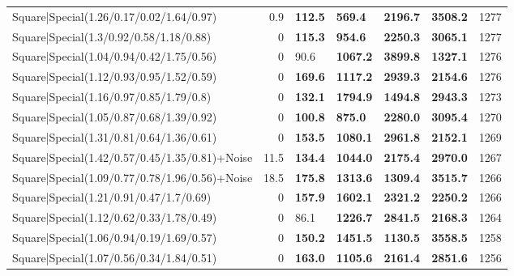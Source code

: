 \begin{tabular}{lrllllr}
 Square|Special(1.26/0.17/0.02/1.64/0.97)                      &             0.9 & \textbf{112.5} & \textbf{569.4}  & \textbf{2196.7} & \textbf{3508.2} &         1277 \\
 Square|Special(1.3/0.92/0.58/1.18/0.88)                       &             0   & \textbf{115.3} & \textbf{954.6}  & \textbf{2250.3} & \textbf{3065.1} &         1277 \\
 Square|Special(1.04/0.94/0.42/1.75/0.56)                      &             0   & 90.6           & \textbf{1067.2} & \textbf{3899.8} & \textbf{1327.1} &         1276 \\
 Square|Special(1.12/0.93/0.95/1.52/0.59)                      &             0   & \textbf{169.6} & \textbf{1117.2} & \textbf{2939.3} & \textbf{2154.6} &         1276 \\
 Square|Special(1.16/0.97/0.85/1.79/0.8)                       &             0   & \textbf{132.1} & \textbf{1794.9} & \textbf{1494.8} & \textbf{2943.3} &         1273 \\
 Square|Special(1.05/0.87/0.68/1.39/0.92)                      &             0   & \textbf{100.8} & \textbf{875.0}  & \textbf{2280.0} & \textbf{3095.4} &         1270 \\
 Square|Special(1.31/0.81/0.64/1.36/0.61)                      &             0   & \textbf{153.5} & \textbf{1080.1} & \textbf{2961.8} & \textbf{2152.1} &         1269 \\
 Square|Special(1.42/0.57/0.45/1.35/0.81)+Noise                &            11.5 & \textbf{134.4} & \textbf{1044.0} & \textbf{2175.4} & \textbf{2970.0} &         1267 \\
 Square|Special(1.09/0.77/0.78/1.96/0.56)+Noise                &            18.5 & \textbf{175.8} & \textbf{1313.6} & \textbf{1309.4} & \textbf{3515.7} &         1266 \\
 Square|Special(1.21/0.91/0.47/1.7/0.69)                       &             0   & \textbf{157.9} & \textbf{1602.1} & \textbf{2321.2} & \textbf{2250.2} &         1266 \\
 Square|Special(1.12/0.62/0.33/1.78/0.49)                      &             0   & 86.1           & \textbf{1226.7} & \textbf{2841.5} & \textbf{2168.3} &         1264 \\
 Square|Special(1.06/0.94/0.19/1.69/0.57)                      &             0   & \textbf{150.2} & \textbf{1451.5} & \textbf{1130.5} & \textbf{3558.5} &         1258 \\
 Square|Special(1.07/0.56/0.34/1.84/0.51)                      &             0   & \textbf{163.0} & \textbf{1105.6} & \textbf{2161.4} & \textbf{2851.6} &         1256 \\

\end{tabular}
